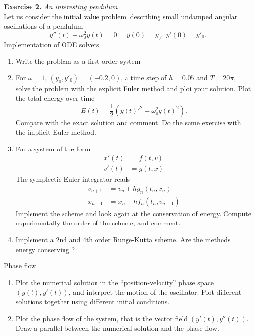 \documentclass{article}
\begin{document}
\vspace{0.5cm}
\noindent \textbf{Exercise 2.} \textit{An interesting pendulum} \\
 Let us consider the initial value problem, describing small undamped angular oscillations of a pendulum
 $$ y''(t) + \omega_0^2 y(t) = 0, \quad y(0)=y_0, \; y'(0) = y'_0. $$
 \underline{Implementation of ODE solvers}
 \begin{enumerate}
     \item Write the problem as a first order system
     \item For $\omega=1$, $(y_0, y'_0) = (-0.2, 0)$, a time step of $h=0.05$ and $T=20\pi$, solve the problem with the explicit Euler method and plot your solution. Plot the total energy over time
     $$E(t) =  \frac{1}{2}\left( y(t)'^2 + \omega_0^2y(t)^2 \right). $$
     Compare with the exact solution and comment. Do the same exercise with the implicit Euler method.
     \item For a system of the form 
     \begin{align*}
        x'(t) &= f(t,v) \\ 
        v'(t) &= g(t,x)
     \end{align*} 
     The symplectic Euler integrator reads
     \begin{align*}
         v_{n+1} &= v_n + h g_n(t_n, x_n) \\
         x_{n+1} &= x_n + h f_n(t_n, v_{n+1})
     \end{align*}
     Implement the scheme and look again at the conservation of energy. Compute experimentally the order of the scheme, and comment.
     \item Implement a 2nd and 4th order Runge-Kutta scheme. Are the methods energy conserving ? 
      \end{enumerate}
      
\noindent \underline{Phase flow}
    \begin{enumerate}
    \item Plot the numerical solution in the ``position-velocity'' phase space $(y(t), y'(t))$, and interpret the motion of the oscillator. Plot different solutions together using different initial conditions.
    \item Plot the phase flow of the system, that is the vector field $(y'(t), y''(t))$. Draw a parallel between the numerical solution and the phase flow.
 \end{enumerate}
 
\end{document}
